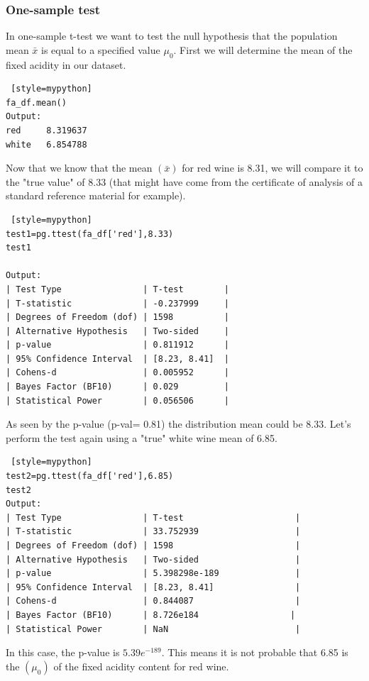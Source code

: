 \subsubsection{One-sample test}
In one-sample t-test we want to test the null hypothesis that the population mean $\bar x$ is equal to a specified value $\mu_0$. First we will determine the mean of the fixed acidity in our dataset.
\begin{lstlisting} [style=mypython]
fa_df.mean()    
Output:
red 	8.319637
white 	6.854788
\end{lstlisting}
Now that we know that the mean $(\bar x)$ for red wine is 8.31, we will compare it to the "true value" of 8.33 (that might have come from the certificate of analysis of a standard reference material for example).
\begin{lstlisting} [style=mypython]
test1=pg.ttest(fa_df['red'],8.33)
test1

Output:
| Test Type                | T-test        |
| T-statistic              | -0.237999     |
| Degrees of Freedom (dof) | 1598          |
| Alternative Hypothesis   | Two-sided     |
| p-value                  | 0.811912      |
| 95% Confidence Interval  | [8.23, 8.41]  |
| Cohens-d                 | 0.005952      |
| Bayes Factor (BF10)      | 0.029         |
| Statistical Power        | 0.056506      |

\end{lstlisting} 
As seen by the p-value (p-val= 0.81) the distribution mean could be 8.33. Let's perform the test again using a "true" white wine mean of 6.85.

\begin{lstlisting} [style=mypython]
test2=pg.ttest(fa_df['red'],6.85)
test2
Output:
| Test Type                | T-test                      |
| T-statistic              | 33.752939                   |
| Degrees of Freedom (dof) | 1598                        |
| Alternative Hypothesis   | Two-sided                   |
| p-value                  | 5.398298e-189               |
| 95% Confidence Interval  | [8.23, 8.41]                |
| Cohens-d                 | 0.844087                    |
| Bayes Factor (BF10)      | 8.726e184                  |
| Statistical Power        | NaN                         |

\end{lstlisting}

In this case, the p-value is $5.39 e^{-189}$. This means it is not probable that 6.85 is the $(\mu_0)$ of the fixed acidity content for red wine.

